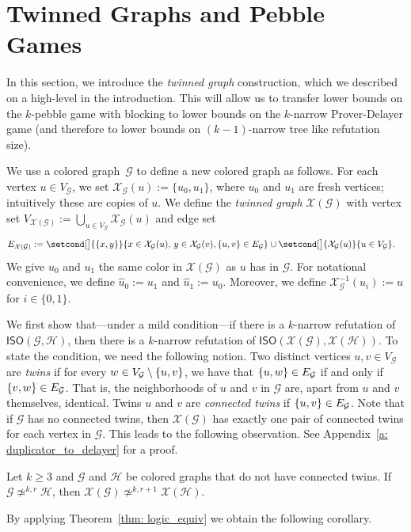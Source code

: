 \documentclass[a4paper,english, thm-restate]{lipics-v2021}
\newcommand{\defining}[1]{\emph{#1}}
\DeclarePairedDelimiter\set{\lbrace}{\rbrace}
\newcommand{\graphG}{\mathcal{G}}
\newcommand{\graphH}{\mathcal{H}}
\newcommand{\vertexG}{V_{\graphG}}
\newcommand{\edgeG}{E_{\graphG}}
\newcommand{\graphXG}{\mathcal{X}(\mathcal{G})}
\newcommand{\graphXH}{\mathcal{X}(\mathcal{H})}
\newcommand{\vertexXG}{V_{\graphXG}}
\newcommand{\edgeXG}{E_{\graphXG}}
\newcommand{\ISO}{\mathsf{ISO}(\graphG, \graphH)}
\newcommand{\XISO}{\mathsf{ISO}(\graphXG, \graphXH)}
\newcommand{\notkequivr}[2]{\not\simeq^{#1,#2}}
\newcommand{\X}{\mathcal{X}}
\newcommand{\XG}{\X_{\graphG}}
\newcommand{\ifAppendix}[1]{#1}
\begin{document}
         
       \section{Twinned Graphs and Pebble Games} \label{sec: Clique}




In this section, we introduce the \emph{twinned graph} construction, which we described on a high-level in the introduction. This will allow us to transfer lower bounds on the $k$-pebble game with blocking to lower bounds on the $k$-narrow Prover-Delayer game (and therefore to lower bounds on $(k-1)$-narrow tree like refutation size). 

%
%
%
%
%
%
%
%
%
%
%
%
%
%
%
%
%
%
%
We use a colored graph~$\graphG$ to define a new colored graph as follows.
For each vertex $u \in \vertexG$, we set $\XG(u) := \{u_0, u_1\}$, where $u_0$ and $u_1$ are fresh vertices; intuitively these are copies of $u$. We define the \defining{twinned graph} $\graphXG$ with vertex set $\vertexXG := \bigcup_{u \in \vertexG} \XG(u)$ and edge set
\begin{align*}
  \edgeXG  &:= \setcond[\big]{ \{x,y\} }{ x \in \XG(u),\, y\in \XG(v), \{u,v\} \in \edgeG} \cup \setcond[\big]{\XG(u)}{ u\in \vertexG}.
\end{align*}  
We give $u_0$ and $u_1$ the same color in $\graphXG$ as $u$ has in $\graphG$. For notational convenience, we define $\hat{u}_0 := u_1$ and $\hat{u}_1 := u_0$. Moreover, we define $\XG^{-1}(u_i) := u$ for $i\in \{0,1\}$.

We first show that---under a mild condition---if there is a $k$-narrow refutation of $\ISO$,
then there is a $k$-narrow refutation of $\XISO$.
To state the condition, we need the following notion. Two distinct vertices $u,v \in \vertexG$ are \defining{twins} if for every $w \in \vertexG \setminus \set{u,v} $, we have that $\set{u,w} \in \edgeG$ if and only if $\set{v,w} \in \edgeG$. That is, the neighborhoods of $u$ and $v$ in $\graphG$ are, apart from $u$ and $v$ themselves, identical. Twins $u$ and $v$ are \defining{connected twins} if $\set{u,v} \in \edgeG$. Note that if $\graphG$ has no connected twins, then $\graphXG$ has exactly one pair of connected twins for each vertex in $\graphG$. This leads to the following observation. \ifAppendix{See Appendix~\ref{a: duplicator_to_delayer} for a proof.}

\begin{lemma} \label{lem: spoiler_win}
Let $k \ge 3$ and $\graphG$ and $\graphH$ be colored graphs that do not have connected twins.
If $\graphG \notkequivr{k}{r} \graphH$, then $\graphXG \notkequivr{k}{r+1} \! \graphXH$. 
\end{lemma}
%
\noindent By applying Theorem~\ref{thm: logic_equiv} we obtain the following corollary. 
\end{document}
